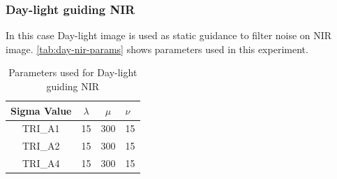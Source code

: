 \documentclass[10pt,twocolumn,letterpaper]{article}
\begin{document}
\subsubsection{Day-light guiding NIR}
In this case Day-light image is used as static guidance to filter noise on NIR image. \autoref{tab:day-nir-params} shows parameters used in this experiment.
\begin{table}[!ht]
	\centering
	\caption{Parameters used for Day-light guiding NIR}
	\label{tab:day-nir-params}
	\begin{tabular}{@{}cccl@{}}
		\toprule
		\bfseries Sigma Value & \(\lambda\) & \(\mu\) & \(\nu\) \\ \midrule
		TRI\_A1               & 15        	& 300	  & 15       \\
		TRI\_A2               & 15       	& 300	  & 15       \\
		TRI\_A4               & 15       	& 300	  & 15       \\ \bottomrule
	\end{tabular}
\end{table}
\end{document}
